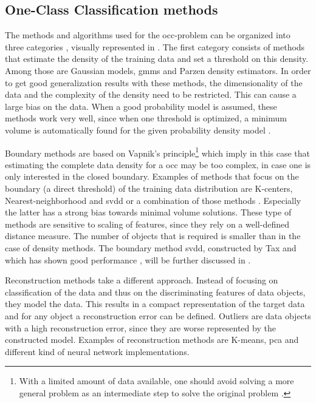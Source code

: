 \subsection{One-Class Classification methods}\label{subsec:occ-methods}
The methods and algorithms used for the \gls{occ}-problem can be organized into three categories \cite{tax2001one,noumir2012simple}, visually represented in .
The first category consists of methods that estimate the density of the training data and set a threshold on this density.
Among those are Gaussian models, \glspl{gmm} and Parzen density estimators.
In order to get good generalization results with these methods, the dimensionality of the data and the complexity of the density need to be restricted.
This can cause a large bias on the data.
When a good probability model is assumed, these methods work very well, since when one threshold is optimized, a minimum volume is automatically found for the given probability density model \cite{tax2001one}.

Boundary methods are based on Vapnik's principle\footnote{With a limited amount of data available, one should avoid solving a more general problem as an intermediate step to solve the original problem \cite{vapnik1998statistical}.} which imply in this case that estimating the complete data density for a \gls{occ} may be too complex, in case one is only interested in the closed boundary.
Examples of methods that focus on the boundary (a direct threshold) of the training data distribution are K-centers, Nearest-neighborhood and \gls{svdd} or a combination of those methods \cite{hempstalk2008one}.
Especially the latter has a strong bias towards minimal volume solutions.
These type of methods are sensitive to scaling of features, since they rely on a well-defined distance measure.
The number of objects that is required is smaller than in the case of density methods.
The boundary method \gls{svdd}, constructed by Tax and which has shown good performance \cite{khan2010survey}, will be further discussed in .

Reconstruction methods take a different approach.
Instead of focusing on classification of the data and thus on the discriminating features of data objects, they model the data.
This results in a compact representation of the target data and for any object a reconstruction error can be defined.
Outliers are data objects with a high reconstruction error, since they are worse represented by the constructed model.
Examples of reconstruction methods are K-means, \gls{pca} and different kind of neural network implementations.

